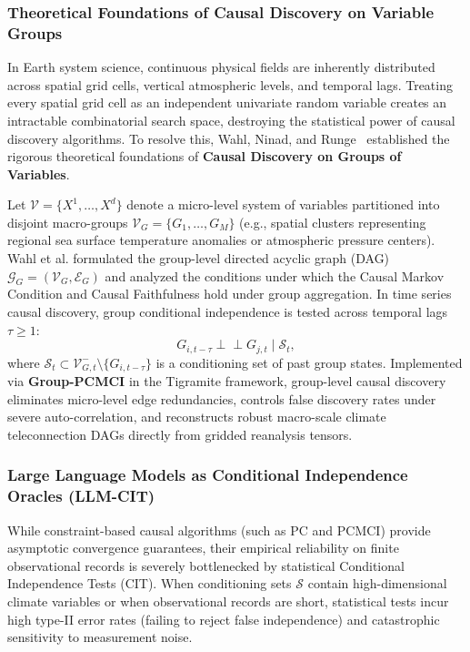 \subsubsection{Theoretical Foundations of Causal Discovery on Variable Groups}
In Earth system science, continuous physical fields are inherently distributed across spatial grid cells, vertical atmospheric levels, and temporal lags. Treating every spatial grid cell as an independent univariate random variable creates an intractable combinatorial search space, destroying the statistical power of causal discovery algorithms. To resolve this, Wahl, Ninad, and Runge~\cite{wahl2023groupcausal} established the rigorous theoretical foundations of \textbf{Causal Discovery on Groups of Variables}.

Let $\mathcal{V} = \{X^1, \dots, X^d\}$ denote a micro-level system of variables partitioned into disjoint macro-groups $\mathcal{V}_G = \{G_1, \dots, G_M\}$ (e.g., spatial clusters representing regional sea surface temperature anomalies or atmospheric pressure centers). Wahl et al. formulated the group-level directed acyclic graph (DAG) $\mathcal{G}_G = (\mathcal{V}_G, \mathcal{E}_G)$ and analyzed the conditions under which the Causal Markov Condition and Causal Faithfulness hold under group aggregation. In time series causal discovery, group conditional independence is tested across temporal lags $\tau \ge 1$:
\begin{equation}
    G_{i, t-\tau} \perp\!\!\!\perp G_{j, t} \mid \mathcal{S}_{t},
    \label{eq:group_cit}
\end{equation}
where $\mathcal{S}_t \subset \mathcal{V}_{G, t}^- \setminus \{G_{i, t-\tau}\}$ is a conditioning set of past group states. Implemented via \textbf{Group-PCMCI} in the Tigramite framework, group-level causal discovery eliminates micro-level edge redundancies, controls false discovery rates under severe auto-correlation, and reconstructs robust macro-scale climate teleconnection DAGs directly from gridded reanalysis tensors.

\subsubsection{Large Language Models as Conditional Independence Oracles (LLM-CIT)}
While constraint-based causal algorithms (such as PC and PCMCI) provide asymptotic convergence guarantees, their empirical reliability on finite observational records is severely bottlenecked by statistical Conditional Independence Tests (CIT). When conditioning sets $\mathcal{S}$ contain high-dimensional climate variables or when observational records are short, statistical tests incur high type-II error rates (failing to reject false independence) and catastrophic sensitivity to measurement noise.

